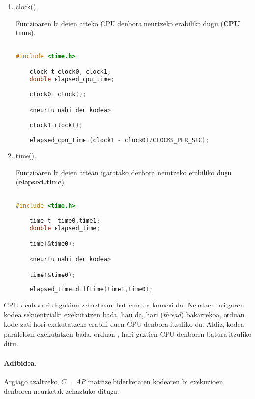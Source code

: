 \begin{enumerate}
\item clock().

Funtzioaren bi deien arteko CPU denbora neurtzeko erabiliko dugu (\textbf{CPU time}).

\begin{lstlisting}[language=C]

#include <time.h>

    clock_t clock0, clock1; 
    double elapsed_cpu_time;

    clock0= clock();

    <neurtu nahi den kodea>

    clock1=clock();
    
    elapsed_cpu_time=(clock1 - clock0)/CLOCKS_PER_SEC);

\end{lstlisting}

\item time().

Funtzioaren bi deien artean igarotako denbora neurtzeko erabiliko dugu (\textbf{elapsed-time}).

\begin{lstlisting}[language=C]

#include <time.h>

    time_t  time0,time1;
    double elapsed_time;

    time(&time0);

    <neurtu nahi den kodea>

    time(&time0);
    
    elapsed_time=difftime(time1,time0);

\end{lstlisting}

\end{enumerate}

CPU denborari dagokion zehaztasun bat ematea komeni da. Neurtzen ari garen kodea sekuentzialki exekutatzen bada, hau da, hari (\emph{thread}) bakarrekoa, orduan kode zati hori exekutatzeko erabili duen CPU denbora itzuliko du. Aldiz, kodea paraleloan exekutatzen bada, orduan , hari guztien CPU denboren batura itzuliko ditu. 


\paragraph*{Adibidea.} Argiago azaltzeko, $C=AB$ matrize biderketaren kodearen bi exekuzioen denboren neurketak zehaztuko ditugu:

